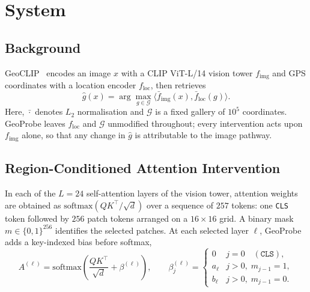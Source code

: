 \section{System}
\label{sec:system}

\subsection{Background}

GeoCLIP~\cite{cepeda2023geoclip} encodes an image $x$ with a CLIP ViT-L/14
vision tower $f_{\mathrm{img}}$ and GPS coordinates with a location encoder
$f_{\mathrm{loc}}$, then retrieves
\begin{equation*}
\hat{g}(x)=\arg\max_{g\in\mathcal{G}}
\langle\bar f_{\mathrm{img}}(x),\bar f_{\mathrm{loc}}(g)\rangle .
\end{equation*}
Here, $\bar{\cdot}$ denotes $L_2$ normalisation and $\mathcal{G}$ is a fixed
gallery of $10^{5}$ coordinates. GeoProbe leaves $f_{\mathrm{loc}}$ and
$\mathcal{G}$ unmodified throughout; every intervention acts upon
$f_{\mathrm{img}}$ alone, so that any change in $\hat{g}$ is attributable to
the image pathway.

\subsection{Region-Conditioned Attention Intervention}
\label{sec:intervention}

In each of the $L=24$ self-attention layers of the vision tower, attention
weights are obtained as $\mathrm{softmax}(QK^{\top}/\sqrt{d})$ over a
sequence of $257$ tokens: one \texttt{CLS} token followed by $256$ patch
tokens arranged on a $16 \times 16$ grid. A binary mask
$m\in\{0,1\}^{256}$ identifies the selected patches. At each selected layer
$\ell$, GeoProbe adds a key-indexed bias before softmax,
\begin{equation}
  A^{(\ell)} = \mathrm{softmax}\!\left(
  \frac{QK^{\top}}{\sqrt{d}} + \beta^{(\ell)} \right),
  \qquad
  \beta^{(\ell)}_{j} =
  \begin{cases}
    0      & j = 0 \quad (\texttt{CLS}), \\
    a_\ell & j > 0,\; m_{j-1} = 1, \\
    b_\ell & j > 0,\; m_{j-1} = 0.
  \end{cases}
  \label{eq:bias}
\end{equation}

